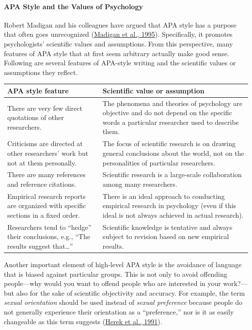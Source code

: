 \documentclass[
]{krantz}
\begin{document}
\hypertarget{apa-style-and-the-values-of-psychology}{%
\paragraph*{APA Style and the Values of Psychology}\label{apa-style-and-the-values-of-psychology}}

Robert Madigan and his colleagues have argued that APA style has a purpose that often goes unrecognized (\protect\hyperlink{ref-madigan1995language}{Madigan et al., 1995}). Specifically, it promotes psychologists' scientific values and assumptions. From this perspective, many features of APA style that at first seem arbitrary actually make good sense. Following are several features of APA-style writing and the scientific values or assumptions they reflect.

\begin{tabular}{l|l}
\hline
APA style feature & Scientific value or assumption\\
\hline
There are very few direct quotations of other researchers. & The phenomena and theories of psychology are objective and do not depend on the specific words a particular researcher used to describe them.\\
\hline
Criticisms are directed at other researchers’ work but not at them personally. & The focus of scientific research is on drawing general conclusions about the world, not on the personalities of particular researchers.\\
\hline
There are many references and reference citations. & Scientific research is a large-scale collaboration among many researchers.\\
\hline
Empirical research reports are organized with specific sections in a fixed order. & There is an ideal approach to conducting empirical research in psychology (even if this ideal is not always achieved in actual research).\\
\hline
Researchers tend to “hedge” their conclusions, e.g., “The results suggest that…” & Scientific knowledge is tentative and always subject to revision based on new empirical results.\\
\hline
\end{tabular}

Another important element of high-level APA style is the avoidance of language that is biased against particular groups. This is not only to avoid offending people---why would you want to offend people who are interested in your work?---but also for the sake of scientific objectivity and accuracy. For example, the term \emph{sexual orientation} should be used instead of \emph{sexual preference} because people do not generally experience their orientation as a ``preference,'' nor is it as easily changeable as this term suggests (\protect\hyperlink{ref-herek1991avoiding}{Herek et al., 1991}).
\end{document}

